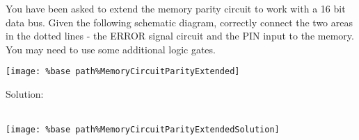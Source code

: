 You have been asked to extend the memory parity circuit to work with a 16 bit data bus.  Given the following schematic diagram, correctly connect the two areas in the dotted lines - the ERROR signal circuit and the PIN input to the memory.  You may need to use some additional logic gates.
\begin{center}
  \texttt{[image: \%base path\%MemoryCircuitParityExtended]}
\end{center}

Solution: \\ \\
\begin{center}
  \texttt{[image: \%base path\%MemoryCircuitParityExtendedSolution]} \\
\end{center}
